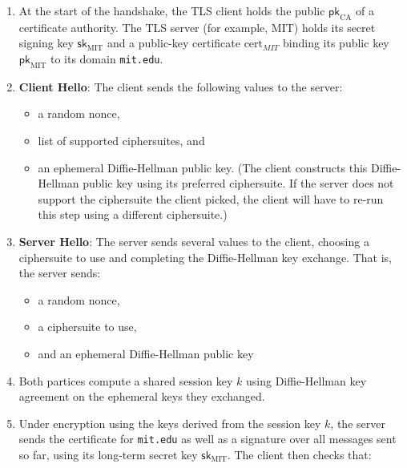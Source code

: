 \documentclass[
  letterpaper,
]{scrbook}
\providecommand{\tightlist}{%
  \setlength{\itemsep}{0pt}\setlength{\parskip}{0pt}}
\newcommand{\sk}{\mathsf{sk}}
\newcommand{\pk}{\mathsf{pk}}
\theoremstyle{definition}
\theoremstyle{plain}
\theoremstyle{plain}
\theoremstyle{remark}
\begin{document}
\begin{enumerate}
\def\labelenumi{\arabic{enumi}.}
\tightlist
\item
  At the start of the handshake, the TLS client holds the public
  \(\pk_{\text{CA}}\) of a certificate authority. The TLS server (for
  example, MIT) holds its secret signing key \(\sk_\text{MIT}\) and a
  public-key certificate \(\text{cert}_{MIT}\) binding its public key
  \(\pk_\text{MIT}\) to its domain \texttt{mit.edu}.
\item
  \textbf{Client Hello}: The client sends the following values to the
  server:

  \begin{itemize}
  \item
    a random nonce,
  \item
    list of supported ciphersuites, and

  \item
    an ephemeral Diffie-Hellman public key. (The client constructs this
    Diffie-Hellman public key using its preferred ciphersuite. If the
    server does not support the ciphersuite the client picked, the
    client will have to re-run this step using a different ciphersuite.)
  \end{itemize}
\item
  \textbf{Server Hello}: The server sends several values to the client,
  choosing a ciphersuite to use and completing the Diffie-Hellman key
  exchange. That is, the server sends:

  \begin{itemize}
  \tightlist
  \item
    a random nonce,
  \item
    a ciphersuite to use,
  \item
    and an ephemeral Diffie-Hellman public key
  \end{itemize}
\item
  Both partices compute a shared session key \(k\) using Diffie-Hellman
  key agreement on the ephemeral keys they exchanged.
\item
  Under encryption using the keys derived from the session key \(k\),
  the server sends the certificate for \texttt{mit.edu} as well as a
  signature over all messages sent so far, using its long-term secret
  key \(\sk_\text{MIT}\). The client then checks that:


\end{enumerate}
\end{document}
